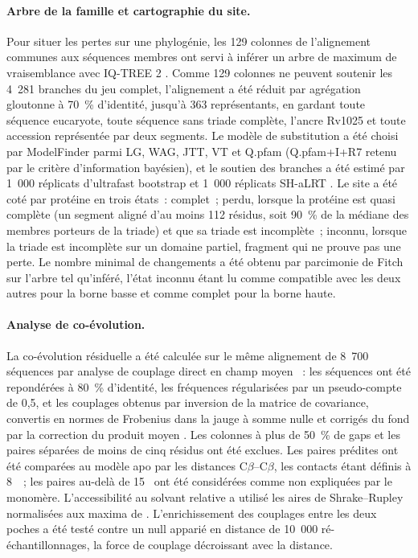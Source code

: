 \documentclass[11pt,a4paper]{article}
\newcommand{\ang}{\text{\AA}}
\begin{document}
\paragraph{Arbre de la famille et cartographie du site.} Pour situer les pertes sur une phylogénie, les 129 colonnes de l'alignement communes aux séquences membres ont servi à inférer un arbre de maximum de vraisemblance avec IQ-TREE 2 \citep{minh2020iqtree2}. Comme 129 colonnes ne peuvent soutenir les 4~281 branches du jeu complet, l'alignement a été réduit par agrégation gloutonne à 70~\% d'identité, jusqu'à 363 représentants, en gardant toute séquence eucaryote, toute séquence sans triade complète, l'ancre Rv1025 et toute accession représentée par deux segments. Le modèle de substitution a été choisi par ModelFinder \citep{kalyaanamoorthy2017modelfinder} parmi LG, WAG, JTT, VT et Q.pfam \citep{minh2021qmaker} (Q.pfam+I+R7 retenu par le critère d'information bayésien), et le soutien des branches a été estimé par 1~000 réplicats d'ultrafast bootstrap \citep{hoang2018ufboot2} et 1~000 réplicats SH-aLRT \citep{guindon2010phyml}. Le site a été coté par protéine en trois états~: complet~; perdu, lorsque la protéine est quasi complète (un segment aligné d'au moins 112 résidus, soit 90~\% de la médiane des membres porteurs de la triade) et que sa triade est incomplète~; inconnu, lorsque la triade est incomplète sur un domaine partiel, fragment qui ne prouve pas une perte. Le nombre minimal de changements a été obtenu par parcimonie de Fitch \citep{fitch1971parsimony} sur l'arbre tel qu'inféré, l'état inconnu étant lu comme compatible avec les deux autres pour la borne basse et comme complet pour la borne haute.

\paragraph{Analyse de co-évolution.} La co-évolution résiduelle a été calculée sur le même alignement de 8~700 séquences par analyse de couplage direct en champ moyen \citep{morcos2011dca}~: les séquences ont été repondérées à 80~\% d'identité, les fréquences régularisées par un pseudo-compte de 0,5, et les couplages obtenus par inversion de la matrice de covariance, convertis en normes de Frobenius dans la jauge à somme nulle et corrigés du fond par la correction du produit moyen \citep{dunn2008apc}. Les colonnes à plus de 50~\% de gaps et les paires séparées de moins de cinq résidus ont été exclues. Les paires prédites ont été comparées au modèle apo par les distances C$\beta$--C$\beta$, les contacts étant définis à 8~\ang{}~; les paires au-delà de 15~\ang{} ont été considérées comme non expliquées par le monomère. L'accessibilité au solvant relative a utilisé les aires de Shrake--Rupley normalisées aux maxima de \citet{tien2013maxasa}. L'enrichissement des couplages entre les deux poches a été testé contre un null apparié en distance de 10~000 ré-échantillonnages, la force de couplage décroissant avec la distance.
\end{document}
